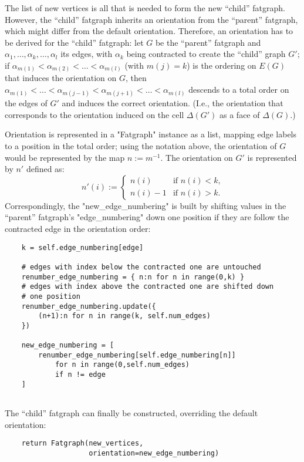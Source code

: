 The list of new vertices is all that is needed to form the new
``child'' fatgraph.  However, the ``child'' fatgraph inherits an
orientation from the ``parent'' fatgraph, which might differ from the
default orientation.  Therefore, an orientation has to be derived for
the ``child'' fatgraph: let $G$ be the ``parent'' fatgraph and
$\alpha_1, \ldots, \alpha_k, \ldots, \alpha_l$ its edges, with
$\alpha_k$ being contracted to create the ``child'' graph $G'$; if
$\alpha_{m(1)} < \alpha_{m(2)} < \ldots < \alpha_{m(l)}$ (with $m(j) = k$)
is the ordering on $E(G)$ that induces the orientation on $G$, then
$\alpha_{m(1)} < \ldots < \alpha_{m(j-1)} < \alpha_{m(j+1)} < \ldots
< \alpha_{m(l)}$ descends to a total order on the edges of $G'$ and
induces the correct orientation. (I.e., the orientation that
corresponds to the orientation induced on the cell $\Delta(G')$ as a
face of $\Delta(G)$.)

Orientation is represented in a "Fatgraph" instance as a list, mapping
edge labels to a position in the total order; using the notation
above, the orientation of $G$ would be represented by the map
$n := m^{-1}$.  The orientation on $G'$ is represented by $n'$ defined
as:
\begin{equation*}
  n'(i) :=
  \begin{cases}
    n(i)    &\text{if $n(i)<k$,} 
    \\
    n(i)-1  &\text{if $n(i)>k$.}
  \end{cases}
\end{equation*}
Correspondingly, the "new_edge_numbering" is built by shifting values
in the ``parent'' fatgraph's "edge_numbering" down one position if
they are follow the contracted edge in the orientation order:
\begin{lstlisting}
    k = self.edge_numbering[edge]

    # edges with index below the contracted one are untouched
    renumber_edge_numbering = { n:n for n in range(0,k) }
    # edges with index above the contracted one are shifted down
    # one position
    renumber_edge_numbering.update({ 
        (n+1):n for n in range(k, self.num_edges) 
    })

    new_edge_numbering = [ 
        renumber_edge_numbering[self.edge_numbering[n]]
            for n in range(0,self.num_edges)
            if n != edge 
    ]
    
\end{lstlisting}

The ``child'' fatgraph can finally be constructed, overriding the
default orientation:
\begin{lstlisting}
    return Fatgraph(new_vertices, 
                    orientation=new_edge_numbering)

\end{lstlisting}


